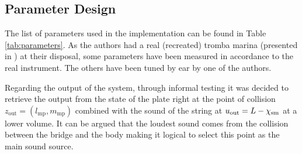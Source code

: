     \subsection{Parameter Design}
    The list of parameters used in the implementation can be found in Table \ref{tab:parameters}. As the authors had a real (recreated) tromba marina (presented in \cite{Baldwin2016:SMC2020}) at their disposal, some parameters have been measured in accordance to the real instrument. The others have been tuned by ear by one of the authors.
    
    Regarding the output of the system, through informal testing it was decided to retrieve the output from the state of the plate right at the point of collision $z_\text{out} = (l_\text{mp},m_\text{mp})$ combined with the sound of the string at $u_\text{out} = L - \chi_\text{sm}$ at a lower volume. It can be argued that the loudest sound comes from the collision between the bridge and the body making it logical to select this point as the main sound source. 
    
